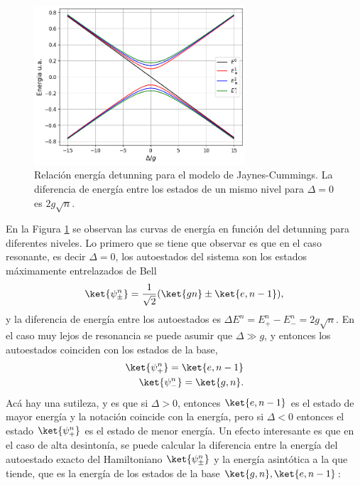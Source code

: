\begin{figure}
    \centering
    \includegraphics[width=0.7\textwidth]{figuras/ch3/relacion energia detunning jcm simple.png}
    \caption{Relaci\'on energ\'ia detunning para el modelo de Jaynes-Cummings. La diferencia de energ\'ia entre los estados de un mismo nivel para $\Delta=0$ es $2g\sqrt{n}$.}
    \label{fig:relación energia detunning jcm1}
\end{figure}
En la Figura \ref{fig:relación energia detunning jcm1} se observan las curvas de energ\'ia en funci\'on del detunning para diferentes niveles. Lo primero que se tiene que observar es que en el caso resonante, es decir $\Delta=0$, los autoestados del sistema son los estados máximamente entrelazados de Bell
\begin{equation}
    \ket{\psi_\pm^n}=\frac{1}{\sqrt{2}}(\ket{gn}\pm\ket{e,n-1}), 
\end{equation} 
y la diferencia de energ\'ia entre los autoestados es $\Delta E^n =E^n_+-E^n_-=2g\sqrt{n}$. En el caso muy lejos de resonancia se puede asumir que $\Delta \gg g $, y entonces los autoestados coinciden con los estados de la base, 
\begin{equation}
    \begin{aligned}
        \ket{\psi^n_+}=\ket{e,n-1} \\
        \ket{\psi^n_-}=\ket{g,n}.
    \end{aligned}
\end{equation}
Ac\'a hay una sutileza, y es que si $\Delta>0$, entonces $\ket{e,n-1}$ es el estado de mayor energ\'ia y la notaci\'on coincide con la energ\'ia, pero si $\Delta<0$ entonces el estado $\ket{\psi^n_+}$ es el estado de menor energ\'ia. 
Un efecto interesante es que en el caso de alta desinton\'ia, se puede calcular la diferencia entre la energía del autoestado exacto del Hamiltoniano $\ket{\psi_\pm^n}$ y la energía asintótica a la que tiende, que es la energía de los estados de la base $\ket{g,n},\ket{e,n-1}$:

